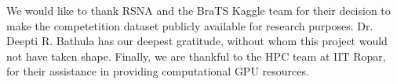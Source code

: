 

\begin{acknowledgements}      %


We would like to thank RSNA and the BraTS Kaggle team for their decision to make the competetition dataset publicly available for research purposes. Dr. Deepti R. Bathula has our deepest gratitude, without whom this project would not have taken shape. Finally, we are thankful to the HPC team at IIT Ropar, for their assistance in providing computational GPU resources. 


\end{acknowledgements}


